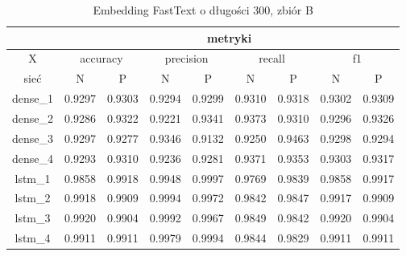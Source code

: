 \begin{table}[p] \label{tab:wyniki_fastex_B} \centering
    \caption{Embedding FastText o długości 300, zbiór B}
    \begin{tabular} {|c|c|c|c|c|c|c|c|c| }    \hline
                 & \multicolumn{8}{c|}{metryki}                                                                                                                               \\ \hline
        X        & \multicolumn{2}{c|}{accuracy} & \multicolumn{2}{c|}{precision} & \multicolumn{2}{c|}{recall} & \multicolumn{2}{c|}{f1}                                     \\ \hline
        sieć     & N                             & P                              & N                           & P                       & N      & P      & N      & P      \\ \hline
        dense\_1 & 0.9297                        & 0.9303                         & 0.9294                      & 0.9299                  & 0.9310 & 0.9318 & 0.9302 & 0.9309 \\ \hline
        dense\_2 & 0.9286                        & 0.9322                         & 0.9221                      & 0.9341                  & 0.9373 & 0.9310 & 0.9296 & 0.9326 \\ \hline
        dense\_3 & 0.9297                        & 0.9277                         & 0.9346                      & 0.9132                  & 0.9250 & 0.9463 & 0.9298 & 0.9294 \\ \hline
        dense\_4 & 0.9293                        & 0.9310                         & 0.9236                      & 0.9281                  & 0.9371 & 0.9353 & 0.9303 & 0.9317 \\ \hline
        lstm\_1  & 0.9858                        & 0.9918                         & 0.9948                      & 0.9997                  & 0.9769 & 0.9839 & 0.9858 & 0.9917 \\ \hline
        lstm\_2  & 0.9918                        & 0.9909                         & 0.9994                      & 0.9972                  & 0.9842 & 0.9847 & 0.9917 & 0.9909 \\ \hline
        lstm\_3  & 0.9920                        & 0.9904                         & 0.9992                      & 0.9967                  & 0.9849 & 0.9842 & 0.9920 & 0.9904 \\ \hline
        lstm\_4  & 0.9911                        & 0.9911                         & 0.9979                      & 0.9994                  & 0.9844 & 0.9829 & 0.9911 & 0.9911 \\ \hline

\end{tabular}
\end{table}
